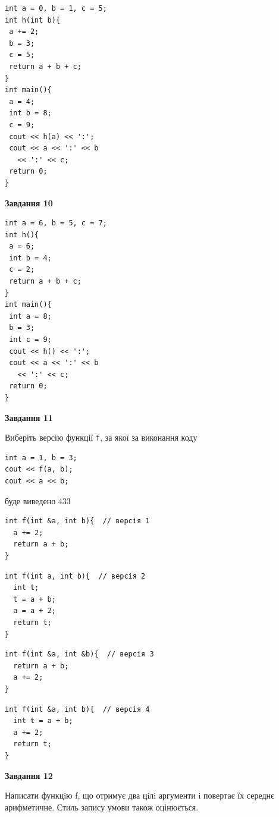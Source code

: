 \documentclass[12pt, ukrainian]{article}
\def\code#1{\Verb!#1!}
\begin{document}
{\begin {large}
\begin{minipage}[t]{7.0cm}
\begin{verbatim}
int a = 0, b = 1, c = 5;
int h(int b){
 a += 2;
 b = 3;
 c = 5;
 return a + b + c;
}
int main(){
 a = 4;
 int b = 8;
 c = 9;
 cout << h(a) << ':';
 cout << a << ':' << b 
   << ':' << c;
 return 0;
}
\end{verbatim}



\begin{center}
\textbf{Завдання 10}
\end{center}
\vspace{-8mm}

\begin{verbatim}
int a = 6, b = 5, c = 7;
int h(){
 a = 6;
 int b = 4;
 c = 2;
 return a + b + c;
}
int main(){
 int a = 8;
 b = 3;
 int c = 9;
 cout << h() << ':';
 cout << a << ':' << b 
   << ':' << c;
 return 0;
}
\end{verbatim}

\end{minipage}
\vline \hspace{1mm}
\begin{minipage}[t]{11.0cm}

\begin{center}
\textbf{Завдання 11}
\end{center}
Виберіть версію функції \code{f}, за якої за виконання коду
\begin{verbatim}
int a = 1, b = 3;
cout << f(a, b);
cout << a << b;
\end{verbatim}

буде виведено 433

\begin{verbatim}
int f(int &a, int b){  // версія 1
  a += 2;
  return a + b;
}
\end{verbatim}

\vspace{-8mm}\begin{verbatim}
int f(int a, int b){  // версія 2
  int t;
  t = a + b;
  a = a + 2;
  return t;
}
\end{verbatim}

\vspace{-8mm}\begin{verbatim}
int f(int &a, int &b){  // версія 3
  return a + b;
  a += 2;
}
\end{verbatim}

\vspace{-8mm}\begin{verbatim}
int f(int &a, int b){  // версія 4
  int t = a + b;
  a += 2;
  return t;
}
\end{verbatim}



\begin{center}
\textbf{Завдання 12}
\end{center}

Написати функцiю f, що отримує два цiлi аргументи i повертає їх середнє арифметичне. Стиль запису умови також оцінюється.\par

\end{minipage}

\end {large}}
\newpage
\end{document}
